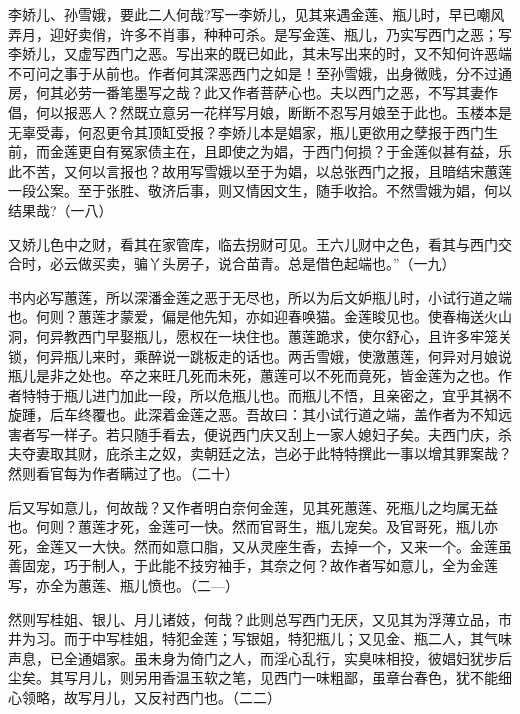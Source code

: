 \begin{showcontents}{}
{李娇儿、孙雪娥，要此二人何哉?写一李娇儿，见其来遇金莲、瓶儿时，早已嘲风弄月，迎好卖俏，许多不肖事，种种可杀。是写金莲、瓶儿，乃实写西门之恶；写李娇儿，又虚写西门之恶。写出来的既已如此，其未写出来的时，又不知何许恶端不可问之事于从前也。作者何其深恶西门之如是！至孙雪娥，出身微贱，分不过通房，何其必劳一番笔墨写之哉？此又作者菩萨心也。夫以西门之恶，不写其妻作倡，何以报恶人？然既立意另一花样写月娘，断断不忍写月娘至于此也。玉楼本是无辜受毒，何忍更令其顶缸受报？李娇儿本是娼家，瓶儿更欲用之孽报于西门生前，而金莲更自有冤家债主在，且即使之为娼，于西门何损？于金莲似甚有益，乐此不苦，又何以言报也？故用写雪娥以至于为娼，以总张西门之报，且暗结宋蕙莲一段公案。至于张胜、敬济后事，则又情因文生，随手收拾。不然雪娥为娼，何以结果哉?（一八）

又娇儿色中之财，看其在家管库，临去拐财可见。王六儿财中之色，看其与西门交合时，必云做买卖，骗丫头房子，说合苗青。总是借色起端也。”（一九）

书内必写蕙莲，所以深潘金莲之恶于无尽也，所以为后文妒瓶儿时，小试行道之端也。何则？蕙莲才蒙爱，偏是他先知，亦如迎春唤猫。金莲睃见也。使春梅送火山洞，何异教西门早娶瓶儿，愿权在一块住也。蕙莲跪求，使尔舒心，且许多牢笼关锁，何异瓶儿来时，乘醉说一跳板走的话也。两舌雪娥，使激蕙莲，何异对月娘说瓶儿是非之处也。卒之来旺几死而未死，蕙莲可以不死而竟死，皆金莲为之也。作者特特于瓶儿进门加此一段，所以危瓶儿也。而瓶儿不悟，且亲密之，宜乎其祸不旋踵，后车终覆也。此深着金莲之恶。吾故曰：其小试行道之端，盖作者为不知远害者写一样子。若只随手看去，便说西门庆又刮上一家人媳妇子矣。夫西门庆，杀夫夺妻取其财，庇杀主之奴，卖朝廷之法，岂必于此特特撰此一事以增其罪案哉？然则看官每为作者瞒过了也。（二十）

后又写如意儿，何故哉？又作者明白奈何金莲，见其死蕙莲、死瓶儿之均属无益也。何则？蕙莲才死，金莲可一快。然而官哥生，瓶儿宠矣。及官哥死，瓶儿亦死，金莲又一大快。然而如意口脂，又从灵座生香，去掉一个，又来一个。金莲虽善固宠，巧于制人，于此能不技穷袖手，其奈之何？故作者写如意儿，全为金莲写，亦全为蕙莲、瓶儿愤也。（二—）

然则写桂姐、银儿、月儿诸妓，何哉？此则总写西门无厌，又见其为浮薄立品，市井为习。而于中写桂姐，特犯金莲；写银姐，特犯瓶儿；又见金、瓶二人，其气味声息，已全通娼家。虽未身为倚门之人，而淫心乱行，实臭味相投，彼娼妇犹步后尘矣。其写月儿，则另用香温玉软之笔，见西门一味粗鄙，虽章台春色，犹不能细心领略，故写月儿，又反衬西门也。（二二）

}
\end{showcontents}
